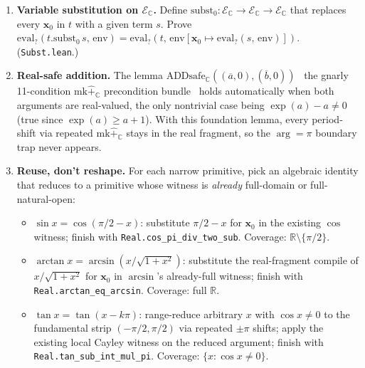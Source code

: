 \documentclass[11pt]{article}
\newcommand{\EsetC}{\mathcal{E}_{\mathbb{C}}}
\theoremstyle{plain}
\theoremstyle{definition}
\begin{document}
\begin{enumerate}[topsep=2pt, itemsep=2pt]
  \item \textbf{Variable substitution on $\EsetC$.} Define
    $\mathrm{subst}_0 : \EsetC \to \EsetC \to \EsetC$ that replaces
    every $\mathbf{x}_0$ in $t$ with a given term $s$. Prove
    $\mathrm{eval}_{?}(t.\mathrm{subst}_0\,s,\,\mathrm{env})
      = \mathrm{eval}_{?}(t,\,\mathrm{env}[\mathbf{x}_0 \mapsto
      \mathrm{eval}_{?}(s,\,\mathrm{env})])$. (\texttt{Subst.lean}.)

  \item \textbf{Real-safe addition.} The lemma
    $\mathrm{ADDsafe}_{\mathbb{C}}((\overline{a},0), (\overline{b},0))$
    \textemdash\ the gnarly 11-condition $\mathrm{mk}\widehat{+}_{\mathbb{C}}$
    precondition bundle \textemdash\ holds automatically when both
    arguments are real-valued, the only nontrivial case being
    $\exp(a) - a \neq 0$ (true since $\exp(a) \geq a + 1$). With this
    foundation lemma, every period-shift via repeated
    $\mathrm{mk}\widehat{+}_{\mathbb{C}}$ stays in the real fragment,
    so the $\arg = \pi$ boundary trap never appears.

  \item \textbf{Reuse, don't reshape.} For each narrow primitive,
    pick an algebraic identity that reduces to a primitive whose
    witness is \emph{already} full-domain or full-natural-open:
    \begin{itemize}[topsep=2pt, itemsep=2pt]
      \item $\sin x = \cos(\pi/2 - x)$: substitute $\pi/2 - x$ for
        $\mathbf{x}_0$ in the existing $\cos$ witness; finish with
        \texttt{Real.cos\_pi\_div\_two\_sub}. Coverage:
        $\mathbb{R}\setminus\{\pi/2\}$.
      \item $\arctan x = \arcsin(x/\sqrt{1+x^2})$: substitute the
        real-fragment compile of $x/\sqrt{1+x^2}$ for $\mathbf{x}_0$
        in $\arcsin$'s already-full witness; finish with
        \texttt{Real.arctan\_eq\_arcsin}. Coverage: full $\mathbb{R}$.
      \item $\tan x = \tan(x - k\pi)$: range-reduce arbitrary $x$ with
        $\cos x \neq 0$ to the fundamental strip $(-\pi/2, \pi/2)$ via
        repeated $\pm\pi$ shifts; apply the existing local Cayley
        witness on the reduced argument; finish with
        \texttt{Real.tan\_sub\_int\_mul\_pi}. Coverage:
        $\{x : \cos x \neq 0\}$.
    \end{itemize}
\end{enumerate}
\end{document}
